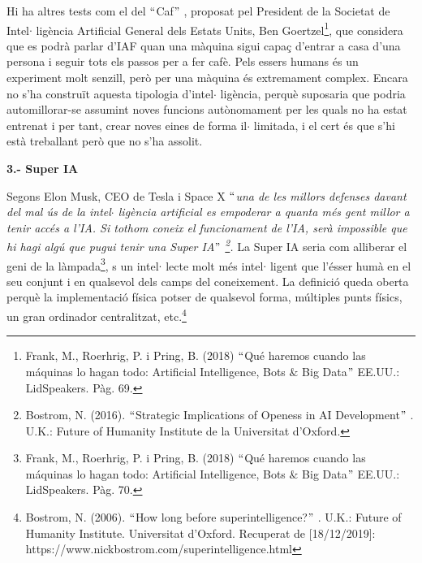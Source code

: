 \documentclass[12pt]{article}
\renewcommand{\_}{\kern-1.5pt\textunderscore\kern-1.5pt}
\begin{document}
\begin{itemize}
\vspace{\baselineskip}
\begin{justify}
Hi ha altres tests com el del $``$Caf$"$ , proposat pel President de la Societat de Intel$ \cdot $ ligència Artificial General dels Estats Units, Ben Goertzel\footnote{ Frank, M., Roerhrig, P. i Pring, B. (2018) $``$Qué haremos cuando las máquinas lo hagan todo: Artificial Intelligence, Bots $\&$  Big Data$"$  EE.UU.: LidSpeakers. Pàg. 69. }, que considera que es podrà parlar d’IAF quan una màquina sigui capaç d’entrar a casa d’una persona i seguir tots els passos per a fer cafè. Pels essers humans és un experiment molt senzill, però per una màquina és extremament complex. Encara no s’ha construït aquesta tipologia d’intel$ \cdot $ ligència, perquè suposaria que podria automillorar-se assumint noves funcions autònomament per les quals no ha estat entrenat i per tant, crear noves eines de forma il$ \cdot $ limitada, i el cert és que s’hi està treballant però que no s’ha assolit. 
\end{justify}\par


\vspace{\baselineskip}

\vspace{\baselineskip}
\textbf{3.- Super IA}\par


\vspace{\baselineskip}
\begin{justify}
Segons Elon Musk, CEO de Tesla i Space X \textit{$``$una de les millors defenses davant del mal ús de la intel$ \cdot $ ligència artificial es empoderar a quanta més gent millor a tenir accés a l’IA. Si tothom coneix el funcionament de l’IA, serà impossible que hi hagi algú que pugui tenir una Super IA$"$ \footnote{  Bostrom, N. (2016). $``$Strategic Implications of Openess in AI Development$"$ . U.K.: Future of Humanity Institute de la Universitat d’Oxford. }. }La Super IA seria com alliberar el geni de la làmpada\footnote{ Frank, M., Roerhrig, P. i Pring, B. (2018) $``$Qué haremos cuando las máquinas lo hagan todo: Artificial Intelligence, Bots $\&$  Big Data$"$  EE.UU.: LidSpeakers. Pàg. 70. }, s un intel$ \cdot $ lecte molt més intel$ \cdot $ ligent que l’ésser humà en el seu conjunt i en qualsevol dels camps del coneixement. La definició queda oberta perquè la implementació física potser de qualsevol forma, múltiples punts físics, un gran ordinador centralitzat, etc.\footnote{ Bostrom, N. (2006). $``$How long before superintelligence?$"$ . U.K.: Future of Humanity Institute. Universitat d’Oxford. Recuperat de [18/12/2019]: https://www.nickbostrom.com/superintelligence.html } 
\end{justify}\par



\end{itemize}
\end{document}
